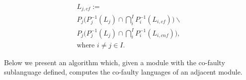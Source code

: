 \documentclass[a4paper, 10pt, conference]{ieeeconf}
\begin{document}
\begin{equation}
\label{}
	\begin{array}{l}
		L_{j,cf} := 
		\\
		P_j\Big(P_j^{-1}(L_j) \cap 
		\bigcap_i^I P_i^{-1}(L_{i,cf})\Big) \backslash 
		\\
		P_j\Big(P_j^{-1}(L_j) \cap 
		\bigcap_i^I P_i^{-1}(L_{i,cnf})\Big),
		\\ 
		\textrm{where } i\neq j\in I.
	\end{array}
\end{equation}


Below we present an algorithm which, given a module with the co-faulty
sublanguage defined, computes the co-faulty languages of an adjacent module.



% 
% 
% 

\end{document}
